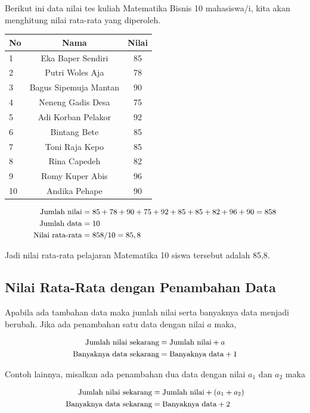 \documentclass[
]{book}
\begin{document}
Berikut ini data nilai tes kuliah Matematika Bisnis 10 mahasiswa/i, kita akan menghitung nilai rata-rata yang diperoleh.

\begin{longtable}[]{@{}lcc@{}}
\toprule
No & Nama & Nilai\tabularnewline
\midrule
\endhead
1 & Eka Baper Sendiri & 85\tabularnewline
2 & Putri Woles Aja & 78\tabularnewline
3 & Bagus Sipemuja Mantan & 90\tabularnewline
4 & Neneng Gadis Desa & 75\tabularnewline
5 & Adi Korban Pelakor & 92\tabularnewline
6 & Bintang Bete & 85\tabularnewline
7 & Toni Raja Kepo & 85\tabularnewline
8 & Rina Capedeh & 82\tabularnewline
9 & Romy Kuper Abis & 96\tabularnewline
10 & Andika Pehape & 90\tabularnewline
\bottomrule
\end{longtable}

\[
\small{
\begin{aligned}
\text{Jumlah nilai} &= 85 + 78 + 90 + 75 + 92 + 85 + 85 + 82 + 96 + 90 = 858 \\
\text{Jumlah data} & = 10\\
\text{Nilai rata-rata} & = 858/10 = 85,8
\end{aligned}
}
\]

Jadi nilai rata-rata pelajaran Matematika 10 siswa tersebut adalah 85,8.

\hypertarget{nilai-rata-rata-dengan-penambahan-data}{%
\subsection{Nilai Rata-Rata dengan Penambahan Data}\label{nilai-rata-rata-dengan-penambahan-data}}

Apabila ada tambahan data maka jumlah nilai serta banyaknya data menjadi berubah. Jika ada penambahan satu data dengan nilai \(a\) maka,

\[
\small{
\begin{aligned}
\text{Jumlah nilai sekarang} &= \text{Jumlah nilai} + a \\ 
\text{Banyaknya data sekarang} & = \text{Banyaknya data} + 1 
\end{aligned}
}
\]

Contoh lainnya, misalkan ada penambahan dua data dengan nilai \(a_1\) dan \(a_2\) maka

\[
\small{
\begin{aligned}
\text{Jumlah nilai sekarang} & = \text{Jumlah nilai} + (a_1 + a_2) \\ 
\text{Banyaknya data sekarang} & = \text{Banyaknya data} + 2
\end{aligned}
}
\]
\end{document}

